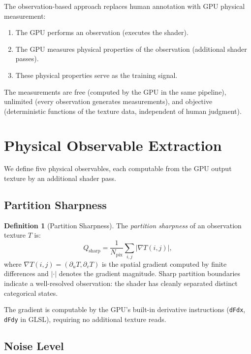 \documentclass[11pt,twocolumn,a4paper]{article}
\theoremstyle{definition}
\newtheorem{definition}[theorem]{Definition}
\theoremstyle{remark}
\newcommand{\Qsharp}{Q_{\mathrm{sharp}}}
\newcommand{\Npix}{N_{\mathrm{pix}}}
\begin{document}
The observation-based approach replaces human annotation with GPU physical measurement:
\begin{enumerate}[nosep]
\item The GPU performs an observation (executes the shader).
\item The GPU measures physical properties of the observation (additional shader passes).
\item These physical properties serve as the training signal.
\end{enumerate}
The measurements are free (computed by the GPU in the same pipeline), unlimited (every observation generates measurements), and objective (deterministic functions of the texture data, independent of human judgment).


\section{Physical Observable Extraction}
\label{sec:observables}

We define five physical observables, each computable from the GPU output texture by an additional shader pass.

\subsection{Partition Sharpness}

\begin{definition}[Partition Sharpness]
\label{def:sharpness}
The \emph{partition sharpness} of an observation texture $T$ is:
\[
\Qsharp = \frac{1}{\Npix} \sum_{i,j} |\nabla T(i,j)|,
\]
where $\nabla T(i,j) = (\partial_u T, \partial_v T)$ is the spatial gradient computed by finite differences and $|\cdot|$ denotes the gradient magnitude. Sharp partition boundaries indicate a well-resolved observation: the shader has cleanly separated distinct categorical states.
\end{definition}

The gradient is computable by the GPU's built-in derivative instructions (\texttt{dFdx}, \texttt{dFdy} in GLSL), requiring no additional texture reads.

\subsection{Noise Level}
\end{document}
